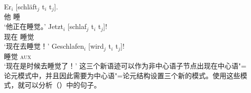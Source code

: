 \eal\settowidth{}
\ex 
\gll Er$_i$    [schläft$_j$ t$_i$ t$_j$].\\
	 他 \spacebr{}睡\\  
\glt `他正在睡觉。'
\ex 
\gll Jetzt$_i$ [schlaf$_j$ t$_i$ t$_j$]!\\
	 现在 \spacebr{}睡觉\\   
\glt `现在去睡觉！'
\ex 
\gll Geschlafen$_i$ [wird$_j$ t$_i$ t$_j$]! \\
	 睡觉 \spacebr{}\textsc{aux}\\
\glt `现在是时候去睡觉了！'
\zl
这三个新语迹可以作为非中心语子节点出现在中心语"=论元模式中，并且因此需要为中心语"=论元结构设置三个新的模式。使用这些模式，就可以分析（）中的句子。

